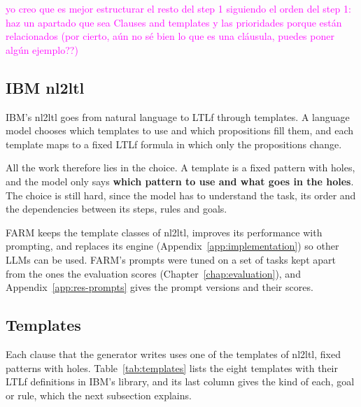 \documentclass[11pt,english,listoffigures,listoftables]{tfgetsinf}
\begin{document}
\textcolor{magenta}{yo creo que es mejor estructurar el resto del step 1 siguiendo el orden del step 1: haz un apartado que sea Clauses and templates y las prioridades porque están relacionados (por cierto, aún no sé bien lo que es una cláusula, puedes poner algún ejemplo??) }

\subsection{IBM nl2ltl}
IBM's nl2ltl \cite{fuggitti2023nl2ltl} goes from natural language to LTLf through templates. A language model chooses which templates to use and which propositions fill them, and each template maps to a fixed LTLf formula in which only the propositions change. 

All the work therefore lies in the choice. A template is a fixed pattern with holes, and the model only says \textbf{which pattern to use and what goes in the holes}. The choice is still hard, since the model has to understand the task, its order and the dependencies between its steps, rules and goals. 

FARM keeps the template classes of nl2ltl, improves its performance with prompting, and replaces its engine (Appendix~\ref{app:implementation}) so other LLMs can be used. FARM's prompts were tuned on a set of tasks kept apart from the ones the evaluation scores (Chapter~\ref{chap:evaluation}), and Appendix~\ref{app:res-prompts} gives the prompt versions and their scores.

\subsection{Templates}
Each clause that the generator writes uses one of the templates of nl2ltl, fixed patterns with holes. Table~\ref{tab:templates} lists the eight templates with their LTLf definitions in IBM's library, and its last column gives the kind of each, goal or rule, which the next subsection explains.
\end{document}
